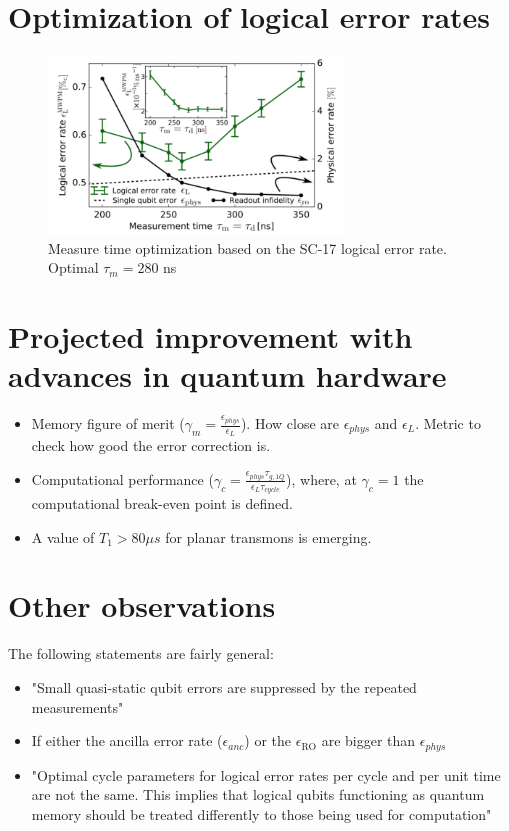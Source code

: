 \documentclass[11pt]{article}
\begin{document}
\section{Optimization of logical error rates}
\label{sec:org063675f}
\begin{figure}[htbp]
\centering
\includegraphics[width=0.7\textwidth]{measure_t_optimization.png}
\caption{\label{fig:orga3deb33}
Measure time optimization based on the SC-17 logical error rate. Optimal \(\tau_m = 280\) ns}
\end{figure}


\section{Projected improvement with advances in quantum hardware}
\label{sec:orgffb70df}

\begin{itemize}
\item Memory figure of merit (\(\gamma_m = \frac{\epsilon_{phys}}{\epsilon_{L}}\)). How close are \(\epsilon_{phys}\) and \(\epsilon_{L}\). Metric to check how good the error correction is.

\item Computational performance (\(\gamma_c = \frac{\epsilon_{phys} \tau_{g,1Q}}{\epsilon_L \tau_{cycle}}\)), where, at \(\gamma_c = 1\) the computational break-even point is defined.

\item A value of \(T_1 > 80 \mu s\) for planar transmons is emerging.
\end{itemize}

\section{Other observations}
\label{sec:orge10c2c4}

The following statements are fairly general:

\begin{itemize}
\item "Small quasi-static qubit errors are suppressed by the repeated measurements"
\item If either the ancilla error rate (\(\epsilon_{anc}\)) or the \(\epsilon_{\text{RO}}\) are bigger than \(\epsilon_{phys}\)
\item "Optimal cycle parameters for logical error rates per cycle and per unit time are not the same. This implies that logical qubits functioning as quantum memory should be treated differently to those being used for computation"
\end{itemize}
\end{document}
